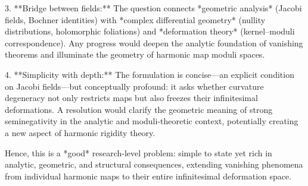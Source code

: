 3. **Bridge between fields:**  
   The question connects *geometric analysis* (Jacobi fields, Bochner identities) with *complex differential geometry* (nullity distributions, holomorphic foliations) and *deformation theory* (kernel–moduli correspondence). Any progress would deepen the analytic foundation of vanishing theorems and illuminate the geometry of harmonic map moduli spaces.  

4. **Simplicity with depth:**  
   The formulation is concise—an explicit condition on Jacobi fields—but conceptually profound: it asks whether curvature degeneracy not only restricts maps but also freezes their infinitesimal deformations. A resolution would clarify the geometric meaning of strong seminegativity in the analytic and moduli-theoretic context, potentially creating a new aspect of harmonic rigidity theory.  

Hence, this is a *good* research-level problem: simple to state yet rich in analytic, geometric, and structural consequences, extending vanishing phenomena from individual harmonic maps to their entire infinitesimal deformation space.